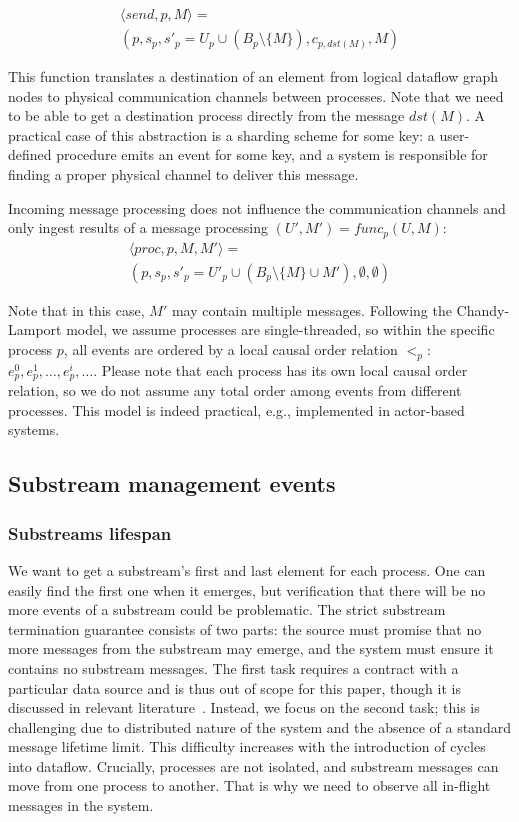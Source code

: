 \begin{multline}
\langle send, p, M \rangle = \\ (p, s_p, s'_p = U_p \cup \left(B_p\setminus\{M\}\right), c_{p, dst(M)}, M)
\end{multline}

This function translates a destination of an element from logical dataflow graph nodes to physical communication channels between processes. Note that we need to be able to get a destination process directly from the message $dst(M)$. A practical case of this abstraction is a sharding scheme for some key: a user-defined procedure emits an event for some key, and a system is responsible for finding a proper physical channel to deliver this message.

Incoming message processing does not influence the communication channels and only ingest results of a message processing $(U', M') = func_p(U, M)$:
\begin{multline}
    \langle proc, p, M, M' \rangle = \\ (p, s_p, s'_p = U'_p \cup \left(B_p \setminus \{M\} \cup M' \right) , \emptyset, \emptyset)
\end{multline}

Note that in this case, $M'$ may contain multiple messages. Following the Chandy-Lamport model, we assume processes are single-threaded, so within the specific process $p$, all events are ordered by a local causal order relation $<_p$: $e^{0}_p,e^{1}_p,\ldots,e^{i}_p,\ldots$. Please note that each process has its own local causal order relation, so we do not assume any total order among events from different processes. This model is indeed practical, e.g., implemented in actor-based systems.

\subsection{Substream management events}
\label{fs-acker-substream-events}
\subsubsection{Substreams lifespan}

We want to get a substream's first and last element for each process. One can easily find the first one when it emerges, but verification that there will be no more events of a substream could be problematic. The strict substream termination guarantee consists of two parts: the source must promise that no more messages from the substream may emerge, and the system must ensure it contains no substream messages. The first task requires a contract with a particular data source and is thus out of scope for this paper, though it is discussed in relevant literature~\cite{awad2019adaptive}. Instead, we focus on the second task; this is challenging due to distributed nature of the system and the absence of a standard message lifetime limit. This difficulty increases with the introduction of cycles into dataflow. Crucially, processes are not isolated, and substream messages can move from one process to another. That is why we need to observe all in-flight messages in the system.

